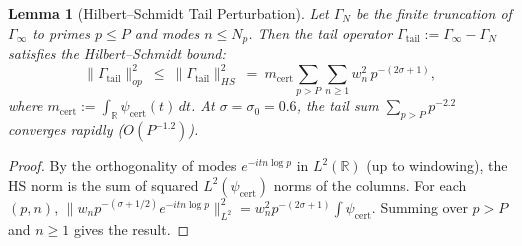 \documentclass[11pt]{article}
\newtheorem{lemma}[theorem]{Lemma}
\theoremstyle{definition}
\theoremstyle{remark}
\theoremstyle{definition}
\newcommand{\R}{\mathbb{R}}
\begin{document}
\begin{lemma}[Hilbert--Schmidt Tail Perturbation]\label{lem:tail-perturbation}
Let $\Gamma_N$ be the finite truncation of $\Gamma_\infty$ to primes $p \le P$ and modes $n \le N_p$.
Then the tail operator $\Gamma_{\mathrm{tail}} := \Gamma_\infty - \Gamma_N$ satisfies the Hilbert--Schmidt bound:
\begin{equation}\label{eq:tail-hs}
  \|\Gamma_{\mathrm{tail}}\|_{op}^2 \ \le \ \|\Gamma_{\mathrm{tail}}\|_{HS}^2 \ = \ m_{\mathrm{cert}} \sum_{p > P} \sum_{n \ge 1} w_n^2 \, p^{-(2\sigma + 1)},
\end{equation}
where $m_{\mathrm{cert}}:=\int_{\R}\psi_{\mathrm{cert}}(t)\,dt$.
At $\sigma = \sigma_0 = 0.6$, the tail sum $\sum_{p > P} p^{-2.2}$ converges rapidly ($O(P^{-1.2})$).
\end{lemma}
\begin{proof}
By the orthogonality of modes $e^{-it n \log p}$ in $L^2(\mathbb{R})$ (up to windowing), the HS norm is the sum of squared $L^2(\psi_{\mathrm{cert}})$ norms of the columns. For each $(p,n)$, $\|w_n p^{-(\sigma+1/2)} e^{-itn\log p}\|_{L^2}^2 = w_n^2 p^{-(2\sigma+1)} \int \psi_{\mathrm{cert}}$. Summing over $p > P$ and $n \ge 1$ gives the result.
\end{proof}
\end{document}
